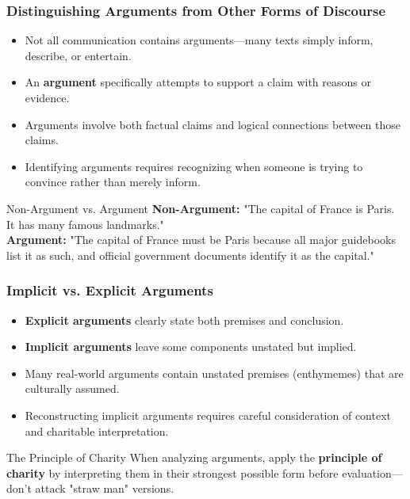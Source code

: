 \documentclass{beamer}
\begin{document}
\begin{frame}
    \frametitle{Distinguishing Arguments from Other Forms of Discourse}
    \begin{itemize}
        \item Not all communication contains arguments—many texts simply inform, describe, or entertain.
        \item An \textbf{argument} specifically attempts to support a claim with reasons or evidence.
        \item Arguments involve both factual claims and logical connections between those claims.
        \item Identifying arguments requires recognizing when someone is trying to convince rather than merely inform.
    \end{itemize}
    
    \begin{exampleblock}{Non-Argument vs. Argument}
        \textbf{Non-Argument:} "The capital of France is Paris. It has many famous landmarks."\\
        \textbf{Argument:} "The capital of France must be Paris because all major guidebooks list it as such, and official government documents identify it as the capital."
    \end{exampleblock}
\end{frame}

\begin{frame}
    \frametitle{Implicit vs. Explicit Arguments}
    \begin{itemize}
        \item \textbf{Explicit arguments} clearly state both premises and conclusion.
        \item \textbf{Implicit arguments} leave some components unstated but implied.
        \item Many real-world arguments contain unstated premises (enthymemes) that are culturally assumed.
        \item Reconstructing implicit arguments requires careful consideration of context and charitable interpretation.
    \end{itemize}
    
    \begin{alertblock}{The Principle of Charity}
        When analyzing arguments, apply the \textbf{principle of charity} by interpreting them in their strongest possible form before evaluation—don't attack "straw man" versions.
    \end{alertblock}
\end{frame}
\end{document}
